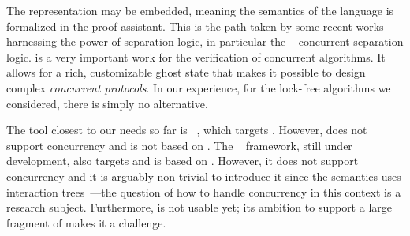 The representation may be embedded, meaning the semantics of the language is formalized in the proof assistant.
This is the path taken by some recent works~\cite{DBLP:books/hal/Chargueraud23, DBLP:journals/pacmpl/GondelmanHPTB23, DBLP:conf/sosp/ChajedTKZ19} harnessing the power of separation logic, in particular the \Iris~\cite{DBLP:journals/jfp/JungKJBBD18} concurrent separation logic.
\Iris is a very important work for the verification of concurrent algorithms.
It allows for a rich, customizable ghost state that makes it possible to design complex \emph{concurrent protocols}.
In our experience, for the lock-free algorithms we considered, there is simply no alternative.

The tool closest to our needs so far is \CFML~\cite{DBLP:books/hal/Chargueraud23}, which targets \OCaml.
However, \CFML does not support concurrency and is not based on \Iris.
The \Osiris~\cite{osiris} framework, still under development, also targets \OCaml and is based on \Iris.
However, it does not support concurrency and it is arguably non-trivial to introduce it since the semantics uses interaction trees~\cite{DBLP:journals/pacmpl/XiaZHHMPZ20}---the question of how to handle concurrency in this context is a research subject.
Furthermore, \Osiris is not usable yet; its ambition to support a large fragment of \OCaml makes it a challenge.
